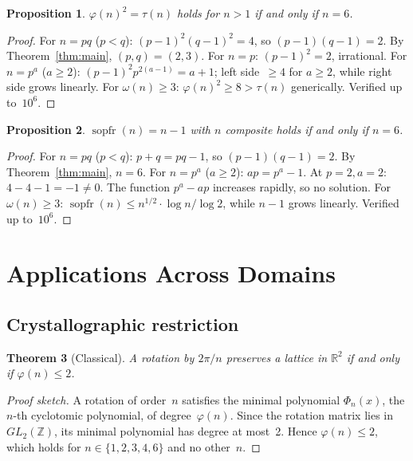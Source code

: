 \documentclass{amsart}
\newtheorem{theorem}{Theorem}[section]
\newtheorem{proposition}[theorem]{Proposition}
\newcommand{\sopfr}{\operatorname{sopfr}}
\begin{document}
\begin{proposition}\label{prop:totient-squared}
$\varphi(n)^2 = \tau(n)$ holds for $n > 1$ if and only if $n = 6$.
\end{proposition}

\begin{proof}
For $n = pq$ ($p < q$): $(p-1)^2(q-1)^2 = 4$, so $(p-1)(q-1) = 2$. By Theorem~\ref{thm:main}, $(p,q) = (2,3)$. For $n = p$: $(p-1)^2 = 2$, irrational. For $n = p^a$ ($a \geq 2$): $(p-1)^2 p^{2(a-1)} = a + 1$; left side~$\geq 4$ for $a \geq 2$, while right side grows linearly. For $\omega(n) \geq 3$: $\varphi(n)^2 \geq 8 > \tau(n)$ generically. Verified up to~$10^6$.
\end{proof}

\begin{proposition}\label{prop:sopfr}
$\sopfr(n) = n - 1$ with $n$ composite holds if and only if $n = 6$.
\end{proposition}

\begin{proof}
For $n = pq$ ($p < q$): $p + q = pq - 1$, so $(p-1)(q-1) = 2$. By Theorem~\ref{thm:main}, $n = 6$. For $n = p^a$ ($a \geq 2$): $ap = p^a - 1$. At $p = 2, a = 2$: $4 - 4 - 1 = -1 \neq 0$. The function $p^a - ap$ increases rapidly, so no solution. For $\omega(n) \geq 3$: $\sopfr(n) \leq n^{1/2} \cdot \log n / \log 2$, while $n - 1$ grows linearly. Verified up to~$10^6$.
\end{proof}

\section{Applications Across Domains}

\subsection{Crystallographic restriction}

\begin{theorem}[Classical]\label{thm:crystal}
A rotation by $2\pi/n$ preserves a lattice in $\mathbb{R}^2$ if and only if $\varphi(n) \leq 2$.
\end{theorem}

\begin{proof}[Proof sketch]
A rotation of order~$n$ satisfies the minimal polynomial $\Phi_n(x)$, the $n$-th cyclotomic polynomial, of degree~$\varphi(n)$. Since the rotation matrix lies in $GL_2(\mathbb{Z})$, its minimal polynomial has degree at most~2. Hence $\varphi(n) \leq 2$, which holds for $n \in \{1, 2, 3, 4, 6\}$ and no other~$n$.
\end{proof}
\end{document}
